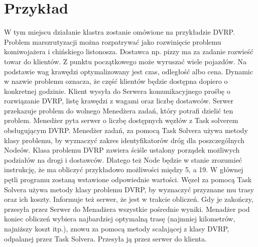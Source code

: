 \documentclass[12pt,a4paper,titlepage]{report}
\begin{document}
		\chapter{Przykład}
		W tym miejscu działanie klastra zostanie omówione na przykładzie DVRP. Problem marszrutyzacji można rozpatrywać jako rozwinięcie problemu komiwojażera i chińskiego listonosza. Dostawca np. pizzy ma za zadanie rozwieść towar do klientów. Z punktu początkowego może wyruszać wiele pojazdów. Na podstawie wag krawędzi optymalizowany jest czas, odległość albo cena. Dynamic w nazwie problemu oznacza, że część klientów będzie dostępna dopiero o konkretnej godzinie.
		Klient wysyła do Serwera komunikacyjnego prośbę o rozwiązanie DVRP, listę krawędzi z wagami oraz liczbę dostawców. Serwer przekazuje problem do wolnego Menedżera zadań, który potrafi dzielić ten problem. Menedżer pyta serwer o liczbę dostępnych węzłów z Task solverem obsługującym DVRP.
		Menedżer zadań, za pomocą Task Solvera używa metody klasy problemu, by wyznaczyć zakres identyfikatorów dróg dla poszczególnych Nodeów. Klasa problemu DVRP zawiera ściśle ustalony porządek możliwych podziałów na drogi i dostawców. Dlatego też Node będzie w stanie zrozumieć instrukcję, że ma obliczyć przykładowo możliwości między 5, a 19. W głównej pętli programu zostaną wstawione odpowiednie wartości.
		Węzeł za pomocą Task Solvera używa metody klasy problemu DVRP, by wyznaczyć przyznane mu trasy oraz ich koszty. Informuje też serwer, że jest w trakcie obliczeń. Gdy je zakończy, przesyła przez Serwer do Menadżera wszystkie pośrednie wyniki. Menadżer pod koniec obliczeń wybiera najbardziej optymalną trasę (najmniej kilometrów, najniższy koszt  itp.), znowu za pomocą metody scalającej z klasy DVRP, odpalanej przez Task Solvera. Przesyła ją przez serwer do klienta.
	
	
\end{document}
